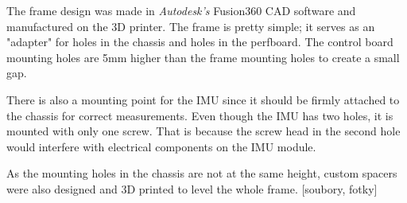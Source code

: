 The frame design was made in \textit{Autodesk's} Fusion360 CAD software and manufactured on the 3D printer. The frame is pretty simple; it serves as an "adapter" for holes in the chassis and holes in the perfboard. The control board mounting holes are 5mm higher than the frame mounting holes to create a small gap.

There is also a mounting point for the IMU since it should be firmly attached to the chassis for correct measurements. Even though the IMU has two holes, it is mounted with only one screw. That is because the screw head in the second hole would interfere with electrical components on the IMU module.

As the mounting holes in the chassis are not at the same height, custom spacers were also designed and 3D printed to level the whole frame.
[\todo soubory, fotky]
